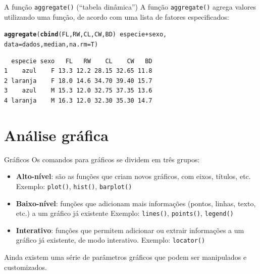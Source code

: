 \documentclass[10pt]{beamer}\usepackage[]{graphicx}\usepackage[]{color}
\makeatletter
\newcommand{\hlopt}[1]{\textcolor[rgb]{0,0,0}{#1}}%
\newcommand{\hlstd}[1]{\textcolor[rgb]{0.345,0.345,0.345}{#1}}%
\newcommand{\hlkwc}[1]{\textcolor[rgb]{0.333,0.667,0.333}{#1}}%
\newcommand{\hlkwd}[1]{\textcolor[rgb]{0.282,0.239,0.545}{\textbf{#1}}}%
\newenvironment{kframe}{%
 \def\at@end@of@kframe{}%
 \ifinner\ifhmode%
  \def\at@end@of@kframe{\end{minipage}}%
  \begin{minipage}{\columnwidth}%
 \fi\fi%
 \def\FrameCommand##1{\hskip\@totalleftmargin \hskip-\fboxsep
 \colorbox{shadecolor}{##1}\hskip-\fboxsep
     \hskip-\linewidth \hskip-\@totalleftmargin \hskip\columnwidth}%
 \MakeFramed {\advance\hsize-\width
   \@totalleftmargin\z@ \linewidth\hsize
   \@setminipage}}%
 {\par\unskip\endMakeFramed%
 \at@end@of@kframe}
\newenvironment{knitrout}{}{} %
\makeatother
\begin{document}
\begin{frame}[fragile]{A função \texttt{aggregate()} (``tabela dinâmica'')}
A função \texttt{aggregate()} agrega valores utilizando uma função, de
acordo com uma lista de fatores especificados:
\begin{knitrout}\small
{}\color{fgcolor}\begin{kframe}
\begin{alltt}
\hlkwd{aggregate}\hlstd{(}\hlkwd{cbind}\hlstd{(FL, RW, CL, CW, BD)} \hlopt{~} \hlstd{especie} \hlopt{+} \hlstd{sexo,}
          \hlkwc{data} \hlstd{= dados, median,} \hlkwc{na.rm}\hlstd{=T)}
\end{alltt}
\begin{verbatim}
  especie sexo   FL   RW    CL    CW   BD
1    azul    F 13.3 12.2 28.15 32.65 11.8
2 laranja    F 18.0 14.6 34.70 39.40 15.7
3    azul    M 15.3 12.0 32.75 37.35 13.6
4 laranja    M 16.3 12.0 32.30 35.30 14.7
\end{verbatim}
\end{kframe}
\end{knitrout}

\end{frame}

\section{Análise gráfica}

\begin{frame}[fragile]{Gráficos}
Os comandos para gráficos se dividem em três grupos:
\begin{itemize}
\item \textbf{Alto-nível}: são as funções que criam novos gráficos, com
  eixos, títulos, etc. Exemplo: \texttt{plot()}, \texttt{hist()},
  \texttt{barplot()}
\item \textbf{Baixo-nível}: funções que adicionam mais informações
  (pontos, linhas, texto, etc.) a um gráfico já existente Exemplo:
  \texttt{lines()}, \texttt{points()}, \texttt{legend()}
\item \textbf{Interativo}: funções que permitem adicionar ou extrair
  informações a um gráfico já existente, de modo interativo. Exemplo:
  \texttt{locator()}
\end{itemize}
Ainda existem uma série de parâmetros gráficos que podem ser manipulados
e customizados.
\end{frame}
\end{document}
